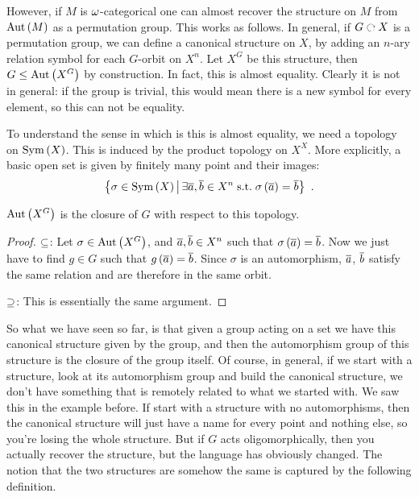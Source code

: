 \documentclass{amsart}
\begin{document}
However, if $M$ is $\omega$-categorical one can almost recover the structure on 
$M$ from $\operatorname{Aut}\left( M \right)$ as a permutation group. 
This works as follows.
In general, if $G\acts X$ is a permutation group, 
we can define a canonical structure on $X$, by adding an $n$-ary relation symbol for each $G$-orbit 
on $X^n$.
Let $X^G$ be this structure, then $G\leq \operatorname{Aut}\left( X^G \right)$ by construction.
In fact, this is almost equality.
Clearly it is not in general: if the group is trivial, 
this would mean there is a new symbol for every element, so this can not be equality.

To understand the sense in which is this is almost equality, we need a topology on $\operatorname{Sym}\left( X \right)$.
This is induced by the product topology on $X^X$.
More explicitly, a basic open set is given by finitely many point and their images:
\begin{equation}
\left\{ \sigma \in \operatorname{Sym}\left( X \right) \, \middle\vert \,\exists \overline{a} , \overline{b}\in X^n \;\text{s.t.}\;
\sigma\left( \overline{a} \right)= \overline{b}  \right\} \ .
\end{equation}

\begin{prop}
$\operatorname{Aut}\left( X^G \right)$ is the closure of $G$ with respect to this topology.
\end{prop}

\begin{proof}
$\subseteq$:
Let $\sigma\in \operatorname{Aut}\left( X^G \right)$, and $\overline{a} , \overline{b}\in X^n$ such that
$\sigma\left( \overline{a} \right) = \overline{b}$.
Now we just have to find $g\in G$ such that $g\left( \overline{a} \right) = \overline{b}$. 
Since $\sigma$ is an automorphism, 
$\overline{a}$, $\overline{b}$ satisfy the same relation and are therefore in the same orbit. 

$\supseteq$: 
This is essentially the same argument. 
\end{proof}

So what we have seen so far, is that given a group acting on a set we have 
this canonical structure given by the group, 
and then the automorphism group of this structure is the closure of the group itself.
Of course, in general, if we start with a structure, look at its automorphism group
and build the canonical structure, we don't have something that is remotely related 
to what we started with.
We saw this in the example before. 
If start with a structure with no automorphisms, then the canonical structure
will just have a name for every point and nothing else, so you're losing the whole structure.
But if $G$ acts oligomorphically, then you actually recover the structure, but the language 
has obviously changed. 
The notion that the two structures are somehow the same
is captured by the following definition.
\end{document}
